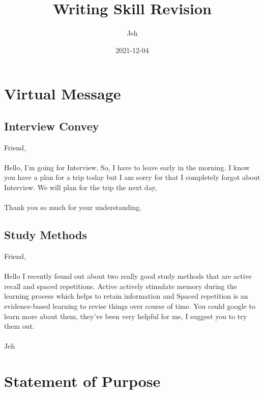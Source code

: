 \documentclass{article}
\title{Writing Skill Revision}
\date{2021-12-04}
\author{Jeh}
\begin{document}
    \maketitle

    \section{Virtual Message}
    \subsection{Interview Convey} Friend,\\\\
    Hello, I'm going for Interview. So,
    I have to leave early in the morning.
    I know you have a plan for a trip today but
    I am sorry for that I completely forgot about
    Interview. We will plan for the trip
    the next day,\\\\
    Thank you so much for your understanding.

    \subsection{Study Methods}
    Friend,\\\\
    Hello I recently found out about two really good
    study methods that are active recall and spaced
    repetitions. Active actively stimulate memory
    during the learning process which helps to retain
    information and Spaced repetition is an evidence-based
    learning to revise things over course of time. You could
    google to learn more about them, they've been very  helpful for me, 
    I suggest you to try them out.\\\\
    Jeh

    \newpage
    \section{Statement of Purpose}
\end{document}
